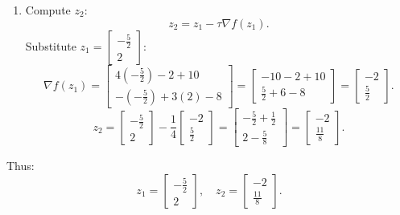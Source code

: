 \documentclass[12pt]{article}
\begin{document}
\begin{enumerate}
\begin{enumerate}
\begin{enumerate}
        \item Compute \( z_2 \):
        \[
        z_2 = z_1 - \tau \nabla f(z_1).
        \]
        Substitute \( z_1 = \begin{bmatrix} -\frac{5}{2} \\ 2 \end{bmatrix} \):
        \[
        \nabla f(z_1) = \begin{bmatrix} 4(-\frac{5}{2}) - 2 + 10 \\ -(-\frac{5}{2}) + 3(2) - 8 \end{bmatrix} = \begin{bmatrix} -10 - 2 + 10 \\ \frac{5}{2} + 6 - 8 \end{bmatrix} = \begin{bmatrix} -2 \\ \frac{5}{2} \end{bmatrix}.
        \]
        \[
        z_2 = \begin{bmatrix} -\frac{5}{2} \\ 2 \end{bmatrix} - \frac{1}{4} \begin{bmatrix} -2 \\ \frac{5}{2} \end{bmatrix} = \begin{bmatrix} -\frac{5}{2} + \frac{1}{2} \\ 2 - \frac{5}{8} \end{bmatrix} = \begin{bmatrix} -2 \\ \frac{11}{8} \end{bmatrix}.
        \]
    \end{enumerate}
    Thus:
    \[
    z_1 = \begin{bmatrix} -\frac{5}{2} \\ 2 \end{bmatrix}, \quad z_2 = \begin{bmatrix} -2 \\ \frac{11}{8} \end{bmatrix}.
    \]
\end{enumerate}


\end{enumerate}
\end{document}
